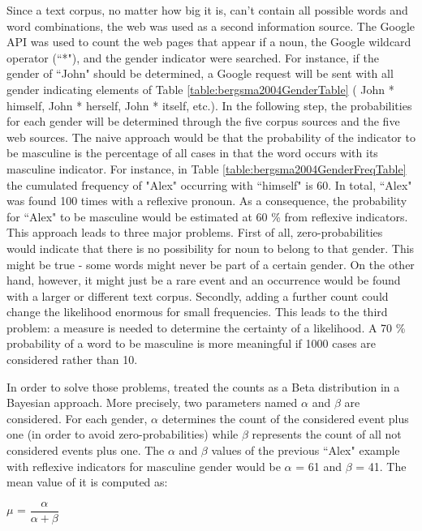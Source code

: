 Since a text corpus, no matter how big it is, can't contain all possible words and word combinations, the web was used as a second information source. The Google API was used to count the web pages that appear if a noun, the Google wildcard operator (“*"), and the gender indicator were searched. For instance, if the gender of “John" should be determined, a Google request will be sent with all gender indicating elements of Table \ref{table:bergsma2004GenderTable} ( John * himself, John * herself, John * itself, etc.).
In the following step, the probabilities for each gender will be determined through the five corpus sources and the five web sources. The naive approach would be that the probability of the indicator to be masculine is the percentage of all cases in that the word occurs with its masculine indicator. For instance, in Table \ref{table:bergsma2004GenderFreqTable} the cumulated frequency of "Alex" occurring with “himself" is 60. In total, “Alex" was found 100 times with a reflexive pronoun. As a consequence, the probability for “Alex" to be masculine would be estimated at 60 \% from reflexive indicators.
This approach leads to three major problems. First of all, zero-probabilities would indicate that there is no possibility for noun to belong to that gender. This might be true - some words might never be part of a certain gender. On the other hand, however, it might just be a rare event and an occurrence would be found with a larger or different text corpus. Secondly, adding a further count could change the likelihood enormous for small frequencies. This leads to the third problem: a measure is needed to determine the certainty of a likelihood. A 70 \% probability of a word to be masculine is more meaningful if 1000 cases are considered rather than 10. 
 
In order to solve those problems, \cite{bergsma2005automatic} treated the counts as a Beta distribution in a Bayesian approach. More precisely, two parameters named $\alpha$ and $\beta$ are considered. For each gender, $\alpha$ determines the count of the considered event plus one (in order to avoid zero-probabilities) while $\beta$ represents the count of all not considered events plus one. The $\alpha$ and $\beta$ values of the previous “Alex" example with reflexive indicators for masculine gender would be $\alpha$ = 61 and $\beta$ = 41. The mean value of it is computed as:
\begin{center}
	 $\mu$ =  $\dfrac{\alpha }{\alpha + \beta}$  
\end{center}

